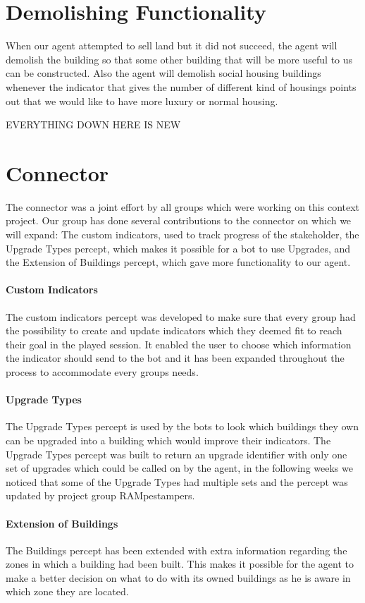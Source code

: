\section{Demolishing Functionality}
When our agent attempted to sell land but it did not succeed, the agent will demolish the building so that some other building that will be more useful to us can be constructed. Also the agent will demolish social housing buildings whenever the indicator that gives the number of different kind of housings points out that we would like to have more luxury or normal housing. 

EVERYTHING DOWN HERE IS NEW


\section{Connector} 
The connector was a joint effort by all groups which were working on this context project. Our group has done several contributions to the connector on which we will expand: The custom indicators, used to track progress of the stakeholder, the Upgrade Types percept, which makes it possible for a bot to use Upgrades, and the Extension of Buildings percept, which gave more functionality to our agent.

\paragraph{Custom Indicators}
The custom indicators percept was developed to make sure that every group had the possibility to create and update indicators which they deemed fit to reach their goal in the played session. It enabled the user to choose which information the indicator should send to the bot and it has been expanded throughout the process to accommodate every groups needs.

\paragraph{Upgrade Types}
The Upgrade Types percept is used by the bots to look which buildings they own can be upgraded into a building which would improve their indicators. The Upgrade Types percept was built to return an upgrade identifier with only one set of upgrades which could be called on by the agent, in the following weeks we noticed that some of the Upgrade Types had multiple sets and the percept was updated by project group RAMpestampers.

\paragraph{Extension of Buildings}
The Buildings percept has been extended with extra information regarding the zones in which a building had been built. This makes it possible for the agent to make a better decision on what to do with its owned buildings as he is aware in which zone they are located.

